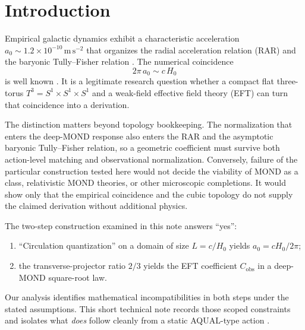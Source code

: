 \documentclass[aps,prd,reprint,superscriptaddress,nofootinbib,floatfix,showkeys]{revtex4-2}
\newcommand{\Tthree}{T^{3}}
\newcommand{\Cobs}{C_{\mathrm{obs}}}
\newcommand{\azero}{a_{0}}
\newcommand{\Hzero}{H_{0}}
\begin{document}

\maketitle

\section{Introduction}
\label{sec:intro}

Empirical galactic dynamics exhibit a characteristic acceleration
\(\azero\sim 1.2\times 10^{-10}\,\mathrm{m\,s^{-2}}\) that organizes the
radial acceleration relation (RAR) and the baryonic Tully--Fisher relation
\cite{mond,famaey_mcgaugh,mcgaugh_rar,lelli_rar}.
The numerical coincidence
\begin{equation}
  2\pi\,\azero \sim c\,\Hzero
  \label{eq:coincidence}
\end{equation}
is well known \cite{mond,famaey_mcgaugh}.  It is a legitimate research question
whether a compact flat three-torus \(\Tthree=S^{1}\times S^{1}\times S^{1}\)
\cite{lachieze_rey_luminet,planck_topology} and a weak-field effective field
theory (EFT) can turn that coincidence into a derivation.

The distinction matters beyond topology bookkeeping.  The normalization that
enters the deep-MOND response also enters the RAR and the asymptotic baryonic
Tully--Fisher relation, so a geometric coefficient must survive both
action-level matching and observational normalization.  Conversely, failure
of the particular construction tested here would not decide the viability of
MOND as a class, relativistic MOND theories, or other microscopic completions.
It would show only that the empirical coincidence and the cubic topology do
not supply the claimed derivation without additional physics.

The two-step construction examined in this note answers ``yes'':
\begin{enumerate}
\item[(A)] ``Circulation quantization'' on a domain of size \(L=c/\Hzero\)
  yields \(\azero=c\Hzero/2\pi\);
\item[(B)] the transverse-projector ratio \(2/3\) yields the EFT coefficient
  \(\Cobs\) in a deep-MOND square-root law.
\end{enumerate}
Our analysis identifies mathematical incompatibilities in both steps under the
stated assumptions.  This short technical note records those scoped
constraints and isolates what \emph{does} follow cleanly from a static
AQUAL-type action \cite{bekenstein_milgrom}.
\end{document}

